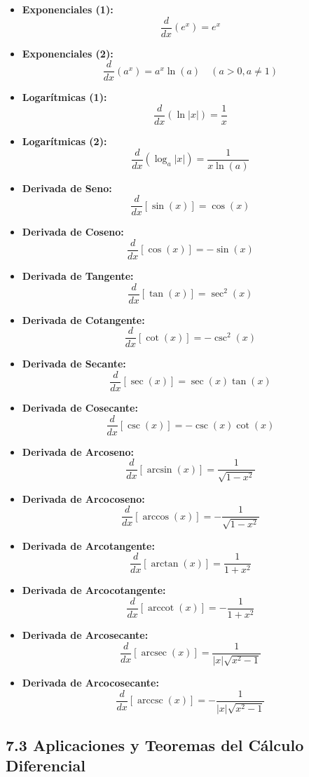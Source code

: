 \documentclass[11pt,a4paper]{article}
\begin{document}
\begin{itemize}
  \item \textbf{Exponenciales (1):}
  \[
    \frac{d}{dx}(e^x) = e^x
  \]
  \item \textbf{Exponenciales (2):}
  \[
    \frac{d}{dx}(a^x) = a^x \ln(a) \quad (a > 0, a \ne 1)
  \]
  \item \textbf{Logarítmicas (1):}
  \[
    \frac{d}{dx}(\ln|x|) = \frac{1}{x}
  \]
  \item \textbf{Logarítmicas (2):}
  \[
    \frac{d}{dx}(\log_a|x|) = \frac{1}{x\ln(a)}
  \]
  \item \textbf{Derivada de Seno:}
  \[
    \frac{d}{dx}[\sin(x)] = \cos(x)
  \]
  \item \textbf{Derivada de Coseno:}
  \[
    \frac{d}{dx}[\cos(x)] = -\sin(x)
  \]
  \item \textbf{Derivada de Tangente:}
  \[
    \frac{d}{dx}[\tan(x)] = \sec^2(x)
  \]
  \item \textbf{Derivada de Cotangente:}
  \[
    \frac{d}{dx}[\cot(x)] = -\csc^2(x)
  \]
  \item \textbf{Derivada de Secante:}
  \[
    \frac{d}{dx}[\sec(x)] = \sec(x)\tan(x)
  \]
  \item \textbf{Derivada de Cosecante:}
  \[
    \frac{d}{dx}[\csc(x)] = -\csc(x)\cot(x)
  \]
  \item \textbf{Derivada de Arcoseno:}
  \[
    \frac{d}{dx}[\arcsin(x)] = \frac{1}{\sqrt{1 - x^2}}
  \]
  \item \textbf{Derivada de Arcocoseno:}
  \[
    \frac{d}{dx}[\arccos(x)] = -\frac{1}{\sqrt{1 - x^2}}
  \]
  \item \textbf{Derivada de Arcotangente:}
  \[
    \frac{d}{dx}[\arctan(x)] = \frac{1}{1 + x^2}
  \]
  \item \textbf{Derivada de Arcocotangente:}
  \[
    \frac{d}{dx}[\operatorname{arccot}(x)] = -\frac{1}{1 + x^2}
  \]
  \item \textbf{Derivada de Arcosecante:}
  \[
    \frac{d}{dx}[\operatorname{arcsec}(x)] = \frac{1}{|x|\sqrt{x^2 - 1}}
  \]
  \item \textbf{Derivada de Arcocosecante:}
  \[
    \frac{d}{dx}[\operatorname{arccsc}(x)] = -\frac{1}{|x|\sqrt{x^2 - 1}}
  \]
\end{itemize}

\subsection*{7.3 Aplicaciones y Teoremas del Cálculo Diferencial}
\end{document}
